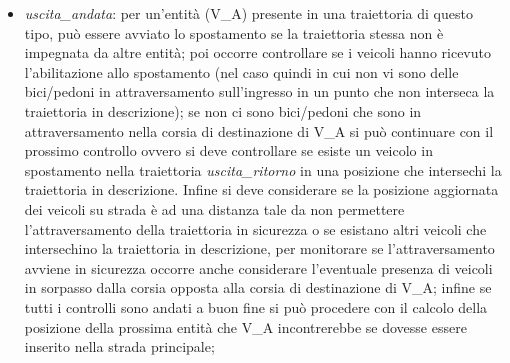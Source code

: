 \begin{enumerate}
\begin{itemize}
\item \textit{u\-sci\-ta\_an\-da\-ta}: per un'entità (V\_A) presente in una traiettoria di questo tipo, può essere avviato lo spostamento se la traiettoria stessa non è impegnata da altre entità; poi occorre controllare se i veicoli hanno ricevuto l'abilitazione allo spostamento (nel caso quindi in cui non vi sono delle bici/pedoni in attraversamento sull'ingresso in un punto che non interseca la traiettoria in descrizione); se non ci sono bici/pedoni che sono in attraversamento nella corsia di destinazione di V\_A si può continuare con il prossimo controllo ovvero si deve controllare se esiste un veicolo in spostamento nella traiettoria \textit{usci\-ta\_ri\-tor\-no} in una posizione che intersechi la traiettoria in descrizione. Infine si deve considerare se la posizione aggiornata dei veicoli su strada è ad una distanza tale da non permettere l'attraversamento della traiettoria in sicurezza o se esistano altri veicoli che intersechino la traiettoria in descrizione, per monitorare se l'attraversamento avviene in sicurezza occorre anche considerare l'eventuale presenza di veicoli in sorpasso dalla corsia opposta alla corsia di destinazione di V\_A; infine se tutti i controlli sono andati a buon fine si può procedere con il calcolo della posizione della prossima entità che V\_A incontrerebbe se dovesse essere inserito nella strada principale;

\end{itemize}
\end{enumerate}
